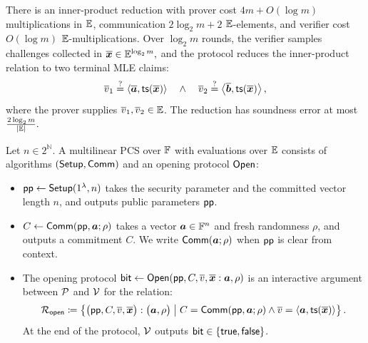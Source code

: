 \begin{fact}
\label{fact:ip}
There is an inner-product reduction with prover cost
\(4m+O(\log m)\) multiplications in \(\mathbb{E}\), communication
\(2\log_2 m+2\) $\mathbb{E}$-elements, and verifier cost
\(O(\log m)\) $\mathbb{E}$-multiplications.
Over \(\log_2 m\) rounds, the verifier samples challenges collected
in
\(
    \overline{\bm x}\in\mathbb{E}^{\log_2 m},
\)
and the protocol reduces the inner-product relation to two
terminal MLE claims:
\[
    \overline{v}_1
    \mathrel{\overset{\mathrm{?}}{=}}
    \left\langle
        \overline{\bm a},
        {\sf ts}(\overline{\bm x})
    \right\rangle
    \quad\wedge\quad
    \overline{v}_2
    \mathrel{\overset{\mathrm{?}}{=}}
    \left\langle
        \overline{\bm b},
        {\sf ts}(\overline{\bm x})
    \right\rangle,
\]
where the prover supplies \(\overline{v}_1,\overline{v}_2\in\mathbb{E}\).
The reduction has soundness error at most
\(
    \frac{2\log_2 m}{\lvert\mathbb{E}\rvert}.
\)
\end{fact}

\begin{definition}
\label{def:pcs}
Let \(n \in 2^\mathbb{N}\). A multilinear PCS over \({\mathbb{F}}\)
with evaluations over \(\mathbb{E}\) consists of algorithms
$({\sf Setup},{\sf Comm})$ and an opening protocol ${\sf Open}$:
\begin{itemize}[leftmargin=*,labelsep=0.5em]
    \item
    \(
        {\sf pp}\leftarrow{\sf Setup}(1^\lambda,n)
    \)
    takes the security parameter and the committed vector length
    \(n\), and outputs public parameters \({\sf pp}\).

    \item
    \(
        C\leftarrow{\sf Comm}({\sf pp},\bm a;\rho)
    \)
    takes a vector \(\bm a\in{\mathbb{F}}^n\) and fresh randomness
    \(\rho\), and outputs a commitment \(C\). We write
    \({\sf Comm}(\bm a;\rho)\) when \({\sf pp}\) is clear from context.

    \item The opening protocol
    \(
        \mathsf{bit}
        \leftarrow
        {\sf Open}\!\left(
            {\sf pp},C,\overline{v},\overline{\bm x}
            :
            \bm a,\rho
        \right)
    \)
    is an interactive argument between \(\mathcal{P}\) and
    \(\mathcal{V}\) for the relation:
    \[
        \mathcal{R}_{\mathsf{open}}
        \coloneqq
        \left\{
            \bigl(
                {\sf pp},C,\overline{v},\overline{\bm x}
            \bigr)
                :
            \bigl(
                \bm a,\rho
            \bigr)
            \;\middle|\;
            \begin{aligned}
                C={\sf Comm}({\sf pp},\bm a;\rho) \wedge
                \overline{v}=\left\langle
            \bm a,
            {\sf ts}(\overline{\bm x})
        \right\rangle
            \end{aligned}
        \right\}.
    \]
    At the end of the protocol, \(\mathcal{V}\) outputs
    \(\mathsf{bit}\in\{{\sf true},{\sf false}\}\).
\end{itemize}
\end{definition}




